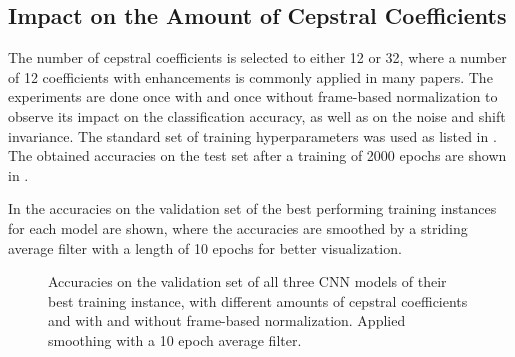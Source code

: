 
\subsection{Impact on the Amount of Cepstral Coefficients}
The number of cepstral coefficients is selected to either 12 or 32, where a number of 12 coefficients with enhancements is commonly applied in many papers.
The experiments are done once with and once without frame-based normalization to observe its impact on the classification accuracy, as well as on the noise and shift invariance.
The standard set of training hyperparameters was used as listed in .
The obtained accuracies on the test set after a training of 2000 epochs are shown in .

In  the accuracies on the validation set of the best performing training instances for each model are shown, where the accuracies are smoothed by a striding average filter with a length of 10 epochs for better visualization.
\begin{figure}[!ht]
  \centering
  \caption{Accuracies on the validation set of all three CNN models of their best training instance, with different amounts of cepstral coefficients and with and without frame-based normalization. Applied smoothing with a 10 epoch average filter.}
  \label{fig:exp_fs_cepstral_acc}
\end{figure}
